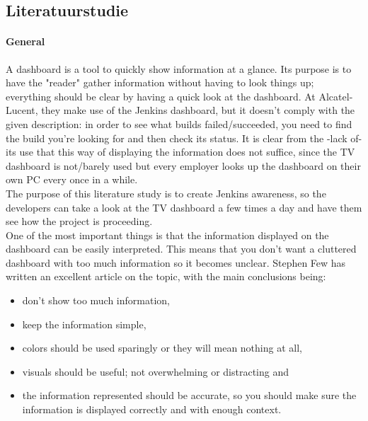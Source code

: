 \documentclass[10pt,a4paper]{article}
\begin{document}
\begin{appendices}
\section{Literatuurstudie}
\label{lit_study}


\paragraph{General}
A dashboard is a tool to quickly show information at a glance. Its purpose is to have the "reader" gather information without having to look things up; everything should be clear by having a quick look at the dashboard. At Alcatel-Lucent, they make use of the Jenkins dashboard, but it doesn't comply with the given description: in order to see what builds failed/succeeded, you need to find the build you're looking for and then check its status. It is clear from the -lack of- its use that this way of displaying the information does not suffice, since the TV dashboard is not/barely used but every employer looks up the dashboard on their own PC every once in a while. \\

The purpose of this literature study is to create Jenkins awareness, so the developers can take a look at the TV dashboard a few times a day and have them see how the project is proceeding.\\
One of the most important things is that the information displayed on the dashboard can be easily interpreted. This means that you don't want a cluttered dashboard with too much information so it becomes unclear.
Stephen Few has written an excellent article on the topic, with the main conclusions being:
\begin{itemize}
\item don't show too much information,
\item keep the information simple,
\item colors should be used sparingly or they will mean nothing at all,
\item visuals should be useful; not overwhelming or distracting and
\item the information represented should be accurate, so you should make sure the information is displayed correctly and with enough context.
\end{itemize}
 

\end{appendices}
\end{document}
